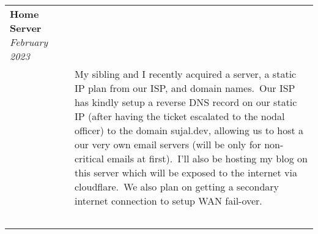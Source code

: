 \documentclass[11pt]{article}
\begin{document}
\begin{tabularx}{\textwidth}{@{}b{90px} b{9px}@{} X@{}}
        \textbf{Home Server} \hfill \textit{February 2023} \\ & &
        My sibling and I recently acquired a server, a static IP plan from our ISP, and domain names.\ Our ISP has
        kindly setup a reverse DNS record on our static IP (after having the ticket escalated to the nodal officer) to
        the domain sujal.dev, allowing us to host a our very own email servers (will be only for non-critical emails
        at first).\ I'll also be hosting my blog on this server which will be exposed to the internet via cloudflare.\
        We also plan on getting a secondary internet connection to setup WAN fail-over.

        \iftoggle{lines}{\\ \\ \hline \\}{\\ \\}

    \end{tabularx}
\end{document}
